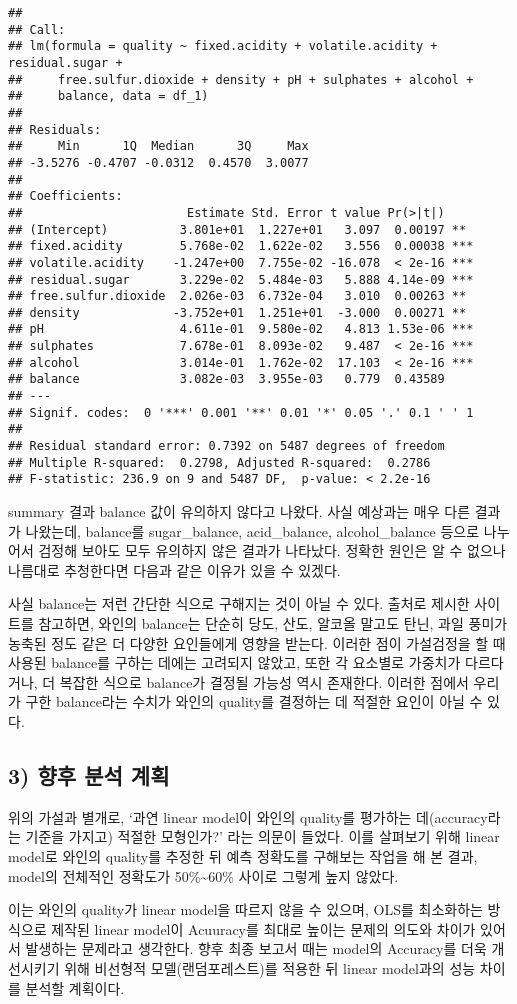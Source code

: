 \documentclass[
]{article}
\begin{document}
\begin{verbatim}
## 
## Call:
## lm(formula = quality ~ fixed.acidity + volatile.acidity + residual.sugar + 
##     free.sulfur.dioxide + density + pH + sulphates + alcohol + 
##     balance, data = df_1)
## 
## Residuals:
##     Min      1Q  Median      3Q     Max 
## -3.5276 -0.4707 -0.0312  0.4570  3.0077 
## 
## Coefficients:
##                       Estimate Std. Error t value Pr(>|t|)    
## (Intercept)          3.801e+01  1.227e+01   3.097  0.00197 ** 
## fixed.acidity        5.768e-02  1.622e-02   3.556  0.00038 ***
## volatile.acidity    -1.247e+00  7.755e-02 -16.078  < 2e-16 ***
## residual.sugar       3.229e-02  5.484e-03   5.888 4.14e-09 ***
## free.sulfur.dioxide  2.026e-03  6.732e-04   3.010  0.00263 ** 
## density             -3.752e+01  1.251e+01  -3.000  0.00271 ** 
## pH                   4.611e-01  9.580e-02   4.813 1.53e-06 ***
## sulphates            7.678e-01  8.093e-02   9.487  < 2e-16 ***
## alcohol              3.014e-01  1.762e-02  17.103  < 2e-16 ***
## balance              3.082e-03  3.955e-03   0.779  0.43589    
## ---
## Signif. codes:  0 '***' 0.001 '**' 0.01 '*' 0.05 '.' 0.1 ' ' 1
## 
## Residual standard error: 0.7392 on 5487 degrees of freedom
## Multiple R-squared:  0.2798, Adjusted R-squared:  0.2786 
## F-statistic: 236.9 on 9 and 5487 DF,  p-value: < 2.2e-16
\end{verbatim}

summary 결과 balance 값이 유의하지 않다고 나왔다. 사실 예상과는 매우
다른 결과가 나왔는데, balance를 sugar\_balance, acid\_balance,
alcohol\_balance 등으로 나누어서 검정해 보아도 모두 유의하지 않은 결과가
나타났다. 정확한 원인은 알 수 없으나 나름대로 추청한다면 다음과 같은
이유가 있을 수 있겠다.

사실 balance는 저런 간단한 식으로 구해지는 것이 아닐 수 있다. 출처로
제시한 사이트를 참고하면, 와인의 balance는 단순히 당도, 산도, 알코올
말고도 탄닌, 과일 풍미가 농축된 정도 같은 더 다양한 요인들에게 영향을
받는다. 이러한 점이 가설검정을 할 때 사용된 balance를 구하는 데에는
고려되지 않았고, 또한 각 요소별로 가중치가 다르다거나, 더 복잡한 식으로
balance가 결정될 가능성 역시 존재한다. 이러한 점에서 우리가 구한
balance라는 수치가 와인의 quality를 결정하는 데 적절한 요인이 아닐 수
있다.

\hypertarget{uxd5a5uxd6c4-uxbd84uxc11d-uxacc4uxd68d}{%
\subsection{3) 향후 분석
계획}\label{uxd5a5uxd6c4-uxbd84uxc11d-uxacc4uxd68d}}

위의 가설과 별개로, `과연 linear model이 와인의 quality를 평가하는
데(accuracy라는 기준을 가지고) 적절한 모형인가?' 라는 의문이 들었다.
이를 살펴보기 위해 linear model로 와인의 quality를 추정한 뒤 예측
정확도를 구해보는 작업을 해 본 결과, model의 전체적인 정확도가
50\%\textasciitilde60\% 사이로 그렇게 높지 않았다.

이는 와인의 quality가 linear model을 따르지 않을 수 있으며, OLS를
최소화하는 방식으로 제작된 linear model이 Acuuracy를 최대로 높이는
문제의 의도와 차이가 있어서 발생하는 문제라고 생각한다. 향후 최종 보고서
때는 model의 Accuracy를 더욱 개선시키기 위해 비선형적
모델(랜덤포레스트)를 적용한 뒤 linear model과의 성능 차이를 분석할
계획이다.
\end{document}
